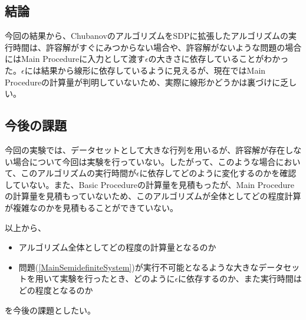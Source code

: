 \subsection{結論}
今回の結果から、ChubanovのアルゴリズムをSDPに拡張したアルゴリズムの実行時間は、許容解がすぐにみつからない場合や、許容解がないような問題の場合にはMain Procedureに入力として渡す$\epsilon$の大きさに依存していることがわかった。$\epsilon$には結果から線形に依存しているように見えるが、現在ではMain Procedureの計算量が判明していないため、実際に線形かどうかは裏づけに乏しい。

\subsection{今後の課題}
今回の実験では、データセットとして大きな行列を用いるが、許容解が存在しない場合について今回は実験を行っていない。したがって、このような場合において、このアルゴリズムの実行時間が$\epsilon$に依存してどのように変化するのかを確認していない。また、Basic Procedureの計算量を見積もったが、Main Procedureの計算量を見積もっていないため、このアルゴリズムが全体としてどの程度計算が複雑なのかを見積もることができていない。

以上から、
\begin{itemize}
  \item アルゴリズム全体としてどの程度の計算量となるのか
  \item 問題(\ref{MainSemidefiniteSystem})が実行不可能となるような大きなデータセットを用いて実験を行ったとき、どのように$\epsilon$に依存するのか、また実行時間はどの程度となるのか
\end{itemize}
を今後の課題としたい。
